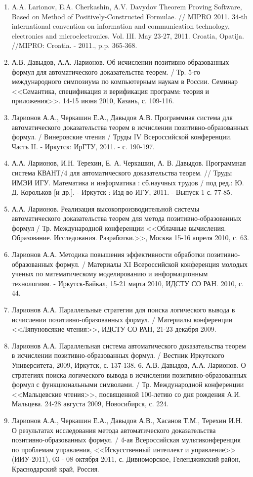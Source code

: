\documentclass[a4paper]{report}
\begin{document}
\begin{enumerate}
\item A.A. Larionov, E.A. Cherkashin, A.V. Davydov Theorem Proving
Software, Based on Method of Positively-Constructed Formulae. // MIPRO
2011. 34-th international convention on information and communication
technology, electronics and microelectronics. Vol. III. May 23-27,
2011. Croatia, Opatija. //MIPRO: Croatia. - 2011., p.p. 365-368.
\item А.В. Давыдов, А.А. Ларионов. Об исчислении позитивно-образованных
формул для автоматического доказательства теорем. / Тр. 5-го
международного симпозиума по компьютерным наукам в России. Семинар
<<Семантика, спецификация и верификация программ: теория и приложения>>.
14-15 июня 2010, Казань, с. 109-116.
\item Ларионов А.А., Черкашин Е.А., Давыдов А.В. Программная система для
автоматического доказательства теорем в исчислении
позитивно-образованных формул. / Винеровские чтения / Труды IV
Всероссийской конференции. Часть II. - Иркутск: ИрГТУ, 2011. - с.
190-197.
\item А.А. Ларионов, И.Н. Терехин, Е. А. Черкашин, А. В. Давыдов.
Программная система КВАНТ/4 для автоматического доказательства теорем.
// Труды ИМЭИ ИГУ. Математика и информатика : сб.научных трудов / под
ред.: Ю. Д. Корольков [и др.]. - Иркутск : Изд-во ИГУ, 2011. - Выпуск
1 с. 77-85.
\item А.А. Ларионов. Реализация высокопроизводительной системы
автоматического доказательства теорем для метода
позитивно-образованных формул / Тр. Международной конференции
<<Облачные вычисления. Образование. Исследования. Разработки.>>, Москва
15-16 апреля 2010,  с. 63.
\item Ларионов А.А. Методика повышения эффективности обработки
позитивно-образованных формул. / Материалы XI Всероссийской
конференция молодых ученых по математическому моделированию и
информационным технологиям. - Иркутск-Байкал, 15-21 марта 2010,  ИДСТУ
СО РАН.  2010, с. 44.
\item Ларионов А.А. Параллельные стратегии для поиска логического вывода
в исчислении позитивно-образованных формул. / Материалы конференции
<<Ляпуновсякие чтения>>, ИДСТУ СО РАН,  21-23 декабря 2009.
\item Ларионов А.А. Параллельная система автоматического доказательства
теорем в исчислении позитивно-образованных формул. / Вестник
Иркутского Университета, 2009, Иркутск, с. 137-138.
6. А.В. Давыдов, А.А. Ларионов. О стратегиях поиска логического вывода
в исчислении позитивно-образованных формул с функциональными
символами. / Тр. Международной конференции <<Мальцевские чтения>>,
посвященной 100-летию со дня рождения А.И. Мальцева. 24-28 августа
2009, Новосибирск, с. 224.
\item Ларионов А.А., Черкашин Е.А., Давыдов А.В., Хасанов Т.М., Терехин
И.Н. О результатах исследования метода автоматического доказательства
позитивно-образованных формул. / 4-ая Всероссийская мультиконференция
по проблемам управления, <<Искусственный интеллект и управление>>
(ИИУ-2011), 03 - 08 октября 2011, с. Дивноморское, Геленджикский
район, Краснодарский край, Россия.
\end{enumerate}
\end{document}
